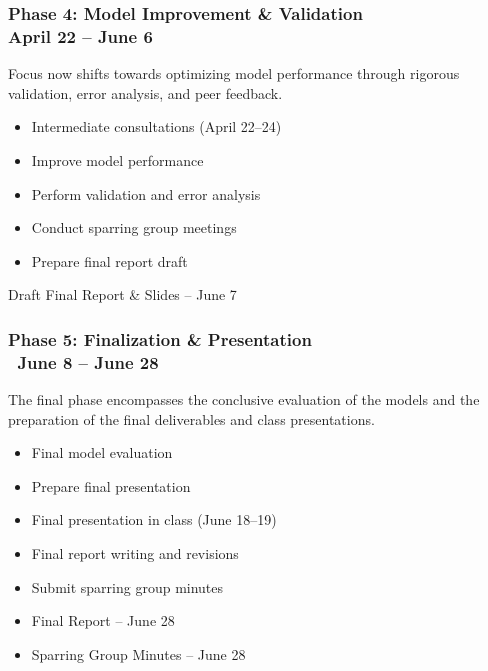 \documentclass[12pt]{article}
\begin{document}
\subsubsection[Phase 4: Model Improvement \& Validation]{Phase 4: Model Improvement \& Validation \\ \normalsize April 22 – June 6}
Focus now shifts towards optimizing model performance through rigorous validation, error analysis, and peer feedback.

\begin{description}[style=multiline, leftmargin=3cm, font=\normalfont\textbf]
    \item[Tasks:] 
    \begin{itemize}[nosep, leftmargin=*]
        \item Intermediate consultations (April 22–24)
        \item Improve model performance
        \item Perform validation and error analysis
        \item Conduct sparring group meetings
        \item Prepare final report draft
    \end{itemize}
    \item[Deliverable:] Draft Final Report \& Slides -- June 7
\end{description}

\subsubsection[Phase 5: Finalization \& Presentation]{Phase 5: Finalization \& Presentation \\ \normalsize\ June 8 – June 28}
The final phase encompasses the conclusive evaluation of the models and the preparation of the final deliverables and class presentations.

\begin{description}[style=multiline, leftmargin=3cm, font=\normalfont\textbf]
    \item[Tasks:] 
    \begin{itemize}[nosep, leftmargin=*]
        \item Final model evaluation
        \item Prepare final presentation
        \item Final presentation in class (June 18–19)
        \item Final report writing and revisions
        \item Submit sparring group minutes
    \end{itemize}
    \item[Deliverables:] 
    \begin{itemize}[nosep, leftmargin=*]
        \item Final Report -- June 28
        \item Sparring Group Minutes -- June 28
    \end{itemize}
\end{description}
\end{document}
